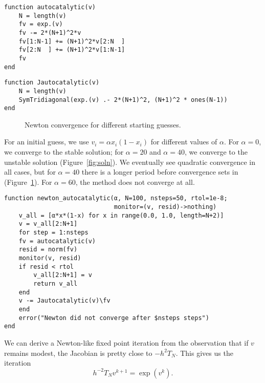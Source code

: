 \documentclass[12pt, leqno]{article} %
\begin{document}
\begin{verbatim}
function autocatalytic(v)
    N = length(v)
    fv = exp.(v)
    fv -= 2*(N+1)^2*v
    fv[1:N-1] += (N+1)^2*v[2:N  ]
    fv[2:N  ] += (N+1)^2*v[1:N-1]
    fv
end
\end{verbatim}

\begin{verbatim}
function Jautocatalytic(v)
    N = length(v)
    SymTridiagonal(exp.(v) .- 2*(N+1)^2, (N+1)^2 * ones(N-1))
end
\end{verbatim}

\begin{figure}
\caption{Newton convergence for different starting guesses.}
\label{fig:newton-cvg}
\end{figure}

For an initial guess, we use $v_i = \alpha x_i(1-x_i)$ for different
values of $\alpha$.  For $\alpha = 0$, we converge to the stable
solution; for $\alpha = 20$ and $\alpha = 40$, we converge to the
unstable solution (Figure~\ref{fig:soln}).  We eventually see
quadratic convergence in all cases, but for $\alpha = 40$ there is a
longer period before convergence sets in
(Figure~\ref{fig:newton-cvg}).  For $\alpha = 60$, the method does not
converge at all.

\begin{verbatim}
function newton_autocatalytic(α, N=100, nsteps=50, rtol=1e-8; 
                              monitor=(v, resid)->nothing)
    v_all = [α*x*(1-x) for x in range(0.0, 1.0, length=N+2)]
    v = v_all[2:N+1]
    for step = 1:nsteps
	fv = autocatalytic(v)
	resid = norm(fv)
	monitor(v, resid)
	if resid < rtol
	    v_all[2:N+1] = v
	    return v_all
	end
	v -= Jautocatalytic(v)\fv
    end
    error("Newton did not converge after $nsteps steps")
end
\end{verbatim}

We can derive a Newton-like fixed point iteration from the observation
that if \(v\) remains modest, the Jacobian is pretty close to
\(-h^2 T_N\). This gives us the iteration
\[h^{-2} T_N v^{k+1} = \exp(v^k).\]
\end{document}

